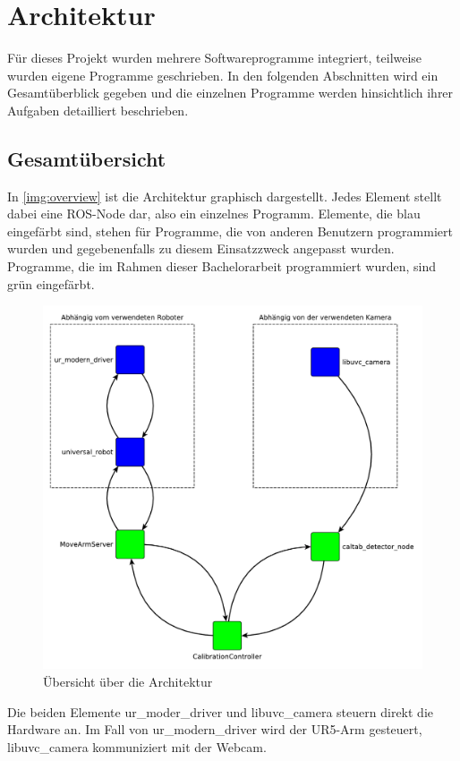 \chapter{Architektur}
Für dieses Projekt wurden mehrere Softwareprogramme integriert, teilweise wurden eigene Programme geschrieben. In den folgenden Abschnitten wird ein Gesamtüberblick gegeben und die einzelnen Programme werden hinsichtlich ihrer Aufgaben detailliert beschrieben.

\section{Gesamtübersicht} %
\label{sec:gesamtübersicht}
In \autoref{img:overview} ist die Architektur graphisch dargestellt. Jedes Element stellt dabei eine ROS-Node dar, also ein einzelnes Programm. Elemente, die blau eingefärbt sind, stehen für Programme, die von anderen Benutzern programmiert wurden und gegebenenfalls zu diesem Einsatzzweck angepasst wurden. Programme, die im Rahmen dieser Bachelorarbeit programmiert wurden, sind grün eingefärbt.


\begin{figure}[!hbt]
	\centering
	\vspace{1ex}
	\includegraphics[scale=0.6]{../images/overview}
	\caption[Übersicht über die Architektur]{\label{img:overview} Übersicht über die Architektur}
	\vspace{1ex}
\end{figure}
Die beiden Elemente ur\_moder\_driver und libuvc\_camera steuern direkt die Hardware an. Im Fall von ur\_modern\_driver wird der UR5-Arm gesteuert, libuvc\_camera kommuniziert mit der Webcam.

